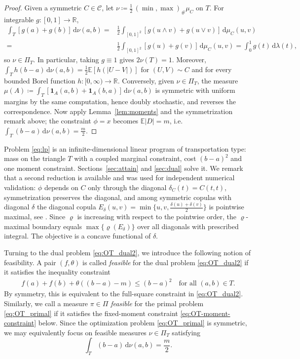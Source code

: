 \documentclass{article}
\newcommand{\CC}{\mathcal{C}}
\newcommand{\de}{\mathrm{\,d}}
\newcommand{\lam}{\lambda}
\newcommand{\E}{\mathbb{E}}
\newcommand{\R}{\mathbb{R}}
\begin{document}
\begin{proof}
	Given a symmetric $C\in\CC$, let $\nu\coloneqq\tfrac12\,(\min,\max)_\#\mu_C$ on $T$.
	For integrable  $g:[0,1]\to\R$,
	\begin{align*}
		\int_T [g(a)+g(b)]\de\nu(a,b)
		=& \frac12\int_{[0,1]^2}[g(u\wedge v)+g(u\vee v)]\de\mu_C(u,v)\\
		=& \frac12\int_{[0,1]^2} [g(u)+g(v)]\de\mu_C(u,v)
		= \int_0^1 g(t)\de\lam(t),
	\end{align*}
	so $\nu\in\Pi_T$.
	In particular, taking $g\equiv1$ gives $2\nu(T)=1$.
	Moreover,
	\(
	\int_T h(b-a)\de\nu(a,b)=\tfrac12\E[h(|U-V|)]
	\)
    for \((U,V)\sim C\) and for every bounded Borel function $h:[0,\infty)\to\R$.
    Conversely, given $\nu\in\Pi_T$, the measure $\mu(A)\coloneqq\int_T[\mathbf 1_A(a,b)+\mathbf 1_A(b,a)]\de\nu(a,b)$ is symmetric with uniform margins by the same computation, hence doubly stochastic, and reverses the correspondence.
    Now apply Lemma~\ref{lem:moments} and the symmetrization remark above; the constraint $\phi=x$ becomes $\E|D|=m$, i.e.\
	\(
	\int_T(b-a)\de\nu(a,b)=\tfrac m2.
	\)
\end{proof}




Problem \eqref{eq:lp} is an infinite-dimensional linear program of transportation type: mass on the triangle $T$ with a coupled marginal constraint, cost $(b-a)^2$ and one moment constraint.
Sections~\ref{sec:attain} and \ref{sec:dual} solve it.
We remark that a second reduction is available and was used for independent numerical validation: $\phi$ depends on $C$ only through the diagonal $\delta_C(t)=C(t,t)$, symmetrization preserves the diagonal, and among symmetric copulas with diagonal $\delta$ the diagonal copula $E_\delta(u,v)=\min\{u,v,\tfrac{\delta(u)+\delta(v)}{2}\}$ is pointwise maximal, see \cite{nelsen2004best,ubedaflores2008best,fernandezsanchez2016members}.
Since $\varrho$ is increasing with respect to the pointwise order, the $\varrho$-maximal boundary equals $\max\{\varrho(E_\delta)\}$ over all diagonals with prescribed integral.
The objective is a concave functional of $\delta$.


Turning to the dual problem \eqref{eq:OT_dual2}, we introduce the following notion of feasibility.
A pair \((f,\theta)\) is called \emph{feasible} for the dual problem \eqref{eq:OT_dual2} if it satisfies the inequality constraint
\begin{align}
    f(a) + f(b) + \theta ((b-a)- m) \leq (b-a)^2 \quad \text{for all } (a,b)\in T.
\end{align}
By symmetry, this is equivalent to the full-square constraint in \eqref{eq:OT_dual2}.
Similarly, we call a measure \(\pi\in\Pi\) \emph{feasible} for the primal problem \eqref{eq:OT_primal} if it satisfies the fixed-moment constraint \eqref{eq:OT-moment-constraint} below.
Since the optimization problem \eqref{eq:OT_primal} is symmetric, we may equivalently focus on feasible measures \(\nu\in\Pi_T\) satisfying
\[
    \int_T(b-a)\de\nu(a,b)=\frac m2.
\]
\end{document}
